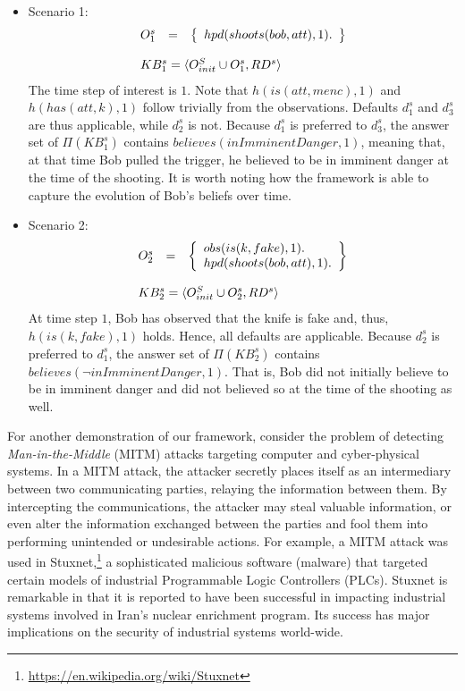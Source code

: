 \documentclass{article}
\begin{document}
\begin{itemize}
\item Scenario 1: \[
\begin{array}{lll}
O^s_{1} & = & \left\{
\begin{array}{l} 
hpd(shoots(bob,att),1). 
\end{array}
\right\}\\
\ \\
\multicolumn{3}{l}{KB^s_1=\langle O^S_{init} \cup O^s_1,RD^s \rangle}
\end{array}
\]
The time step of interest is $1$. Note that $h(is(att,menc),1)$ and $h(has(att,k),1)$ follow trivially from the observations. Defaults $d^s_1$ and $d^s_3$ are thus applicable, while $d^{s}_2$ is not.  Because $d^s_1$ is preferred to $d^s_3$, the answer set of $\Pi(KB^s_1)$ contains $believes(inImminentDanger, 1)$, meaning that, at that time Bob pulled the trigger, he believed to be in imminent danger at the time of the shooting. It is worth noting how the framework is able to capture the evolution of Bob's beliefs over time.  
\item Scenario 2: \[
\begin{array}{lll}
O^s_{2} & = & \left\{
\begin{array}{l} 
obs(is(k,fake),1). \\   %
hpd(shoots(bob,att),1).
\end{array}
\right\} \\
\ \\
\multicolumn{3}{l}{KB^s_2=\langle O^S_{init} \cup O^s_2,RD^s \rangle}
\end{array}
\]
At time step $1$, Bob has observed that the knife is fake and, thus, $h(is(k,fake),1)$ holds. Hence, all defaults are applicable.  Because $d^s_2$ is preferred to $d^s_1$, the answer set of $\Pi(KB^s_2)$ contains $believes(\neg inImminentDanger, 1)$. That is, Bob did not initially believe to be in imminent danger and did not believed so at the time of the shooting as well. 
\end{itemize}


For another demonstration of our framework, consider the problem of detecting \emph{Man-in-the-Middle} (MITM) attacks targeting computer and cyber-physical systems.  In a MITM attack, the attacker secretly places itself as an intermediary between two communicating parties, relaying the information between them. By intercepting the communications, the attacker may steal valuable information, or even alter the information exchanged between the parties and fool them into performing unintended or undesirable actions. 
For example, a MITM attack was used in Stuxnet,\footnote{\tiny \url{https://en.wikipedia.org/wiki/Stuxnet}} a sophisticated malicious software (malware) that targeted certain models of industrial Programmable Logic Controllers (PLCs). Stuxnet is remarkable in that it is reported to have been successful in impacting industrial systems involved in Iran's nuclear enrichment program. Its success has major implications on the security  of industrial systems world-wide.
\end{document}
